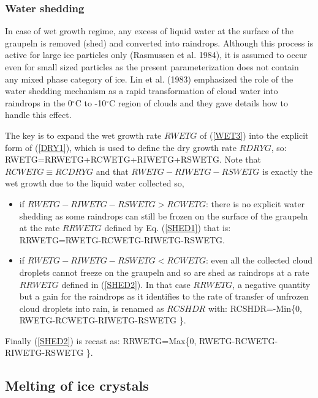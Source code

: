\subsubsection{Water shedding}
%
In case of wet growth regime, any excess of liquid water at the surface of the
graupeln is removed (shed) and converted into raindrops. Although this process
is active for large ice particles only (Rasmussen et al. 1984), it is assumed
to occur even for small sized particles as the present parameterization does
not contain any mixed phase category of ice. Lin et al. (1983) emphasized the
role of the water shedding mechanism as a rapid transformation of cloud water
into raindrops in the 0$^\circ$C to -10$^\circ$C region of clouds and they gave details
how to handle this effect.

The key is to expand the wet growth rate $RWETG$ of (\ref{WET3}) into
the explicit form of (\ref{DRY1}), which is used to define the dry growth rate
$RDRYG$, so:
%
\be\label{SHED1}
RWETG=RRWETG+RCWETG+RIWETG+RSWETG.
\ee
%
\noindent Note that $RCWETG \equiv RCDRYG$ and that $RWETG-RIWETG-RSWETG$ is
exactly the wet growth due to the liquid water collected so,
\begin{itemize}
\item if $RWETG-RIWETG-RSWETG > RCWETG$: there is no explicit water shedding as
some raindrops can still be frozen on the surface of the graupeln at the rate
$RRWETG$ defined by Eq. (\ref{SHED1}) that is:
%
\be\label{SHED2}
RRWETG=RWETG-RCWETG-RIWETG-RSWETG.
\ee
%
\item if $RWETG-RIWETG-RSWETG < RCWETG$: even all the collected cloud droplets
cannot freeze on the graupeln and so are shed as raindrops at a rate $RRWETG$
defined in (\ref{SHED2}). In that case $RRWETG$, a negative quantity but a
gain for the raindrops as it identifies to the rate of transfer of unfrozen
cloud droplets into rain, is renamed as $RCSHDR$ with:
%
\be\label{SHED3}
RCSHDR=-Min\Big\{0, RWETG-RCWETG-RIWETG-RSWETG \Big\}.
\ee
%
\end{itemize}

Finally (\ref{SHED2}) is recast as:
%
\be\label{SHED4}
RRWETG=Max\Big\{0, RWETG-RCWETG-RIWETG-RSWETG \Big\}.
\ee
%

%
\subsection{Melting of ice crystals}
%
%
